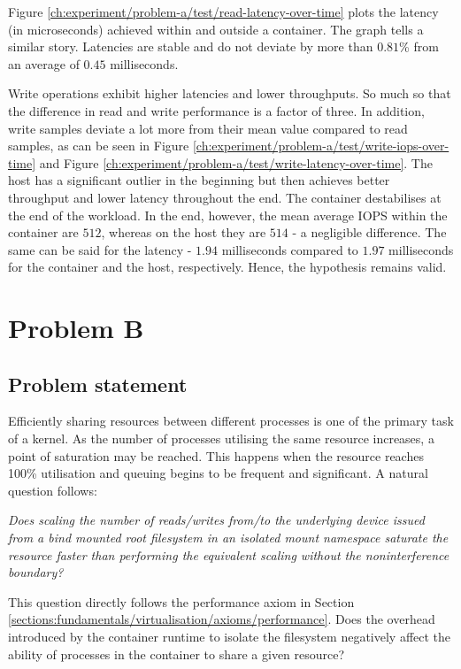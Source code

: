 Figure \ref{ch:experiment/problem-a/test/read-latency-over-time} plots the latency (in microseconds) 
achieved within and outside a container. The graph tells a similar story. Latencies are stable and 
do not deviate by more than $0.81$\% from an average of $0.45$ milliseconds. 

Write operations exhibit higher latencies and lower throughputs.
So much so that the difference in read and write performance is a factor of three.
In addition, write samples deviate a lot more from their mean value compared to 
read samples, as can be seen in Figure \ref{ch:experiment/problem-a/test/write-iops-over-time}
and Figure \ref{ch:experiment/problem-a/test/write-latency-over-time}. The host 
has a significant outlier in the beginning but then achieves better throughput and lower 
latency throughout the end. The container destabilises at the end of the workload.
In the end, however, the mean average IOPS within the container are $512$, whereas on the host 
they are $514$ - a negligible difference. The same can be said for the latency - $1.94$ milliseconds compared to 
$1.97$ milliseconds for the container and the host, respectively.  Hence, the hypothesis remains valid.

\section{Problem B}
\subsection{Problem statement}
Efficiently sharing resources between different processes is one of the primary task of a kernel.
As the number of processes utilising the same resource increases, a point of saturation may be reached. 
This happens when the resource reaches 100\% utilisation and queuing begins to be frequent and significant.
A natural question follows:

\textit{Does scaling the number of reads/writes from/to the underlying device issued from a bind mounted 
root filesystem in an isolated mount namespace saturate the resource faster than performing the 
equivalent scaling without the noninterference boundary?}

This question directly follows the performance axiom in Section \ref{sections:fundamentals/virtualisation/axioms/performance}.
Does the overhead introduced by the container runtime to isolate the filesystem negatively affect 
the ability of processes in the container to share a given resource?


